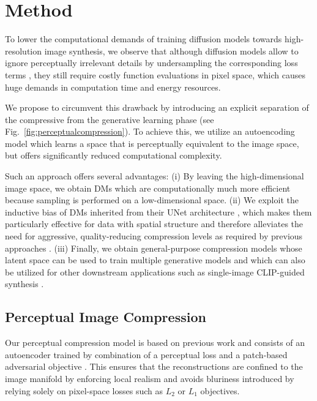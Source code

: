 \documentclass[10pt,twocolumn,letterpaper]{article}
\begin{document}
%
%
%
%

%
%
%


\section{Method}
\enlargethispage{\baselineskip}
\label{sec:method}
\vspace{-0.5em}
%
%
%
%
%
%
To lower the computational demands of training diffusion models towards high-resolution image synthesis, 
%
we observe
that although diffusion models 
%
allow
to ignore perceptually irrelevant details by undersampling the corresponding loss terms \cite{DBLP:conf/nips/HoJA20}, 
they still require costly function evaluations in pixel space,
%
%
which causes
huge demands in computation time and energy resources. 
%
%
%
%
%
%
%

We propose to circumvent this drawback by introducing an explicit separation
 of the compressive from the generative learning phase (see
 Fig.~\ref{fig:perceptualcompression}).
 To achieve this, we utilize an autoencoding model which learns a space that is perceptually equivalent to the image space, 
but offers significantly reduced computational complexity.%

%
%

Such an approach offers several advantages: (i)
By leaving the high-dimensional image space, we 
obtain DMs which are computationally much more efficient
%
%
%
%
because sampling is performed on a low-dimensional space.
%
%
%
%
(ii)
%
We exploit the inductive bias of DMs inherited from their UNet architecture
\cite{DBLP:conf/miccai/RonnebergerFB15}, which makes them particularly effective for data with spatial
structure and therefore
%
%
%
%
%
%
%
alleviates the need for aggressive, quality-reducing compression levels as required by previous
approaches \cite{DBLP:journals/corr/abs-2012-09841,
DBLP:journals/corr/abs-2102-12092}.
%
%
%
(iii)
Finally, we obtain general-purpose compression models whose latent space 
can be used to train multiple generative models
%
and which can also be utilized
for other downstream applications such as single-image CLIP-guided synthesis \cite{Frans2021CLIPDrawET}.
%
%
%
%
%
%
%
%
%
%
%
%
%
%
%
%
%
%
%
%
%
%
%
%
%
%
%
%
%
%
%
%
%
%
%
%
%
%
%
%
%
%
%
%
%
%
%

%
%
%
%
%
%

%
\subsection{Perceptual Image Compression}
\vspace{-0.5em}
\label{subsec:stageone}
%
%
%
%
%
%
%
%
%
%
%
Our perceptual compression model 
%
is based on previous work \cite{DBLP:journals/corr/abs-2012-09841} and
consists of an autoencoder trained by combination of a perceptual
loss \cite{lpips} and a patch-based \cite{DBLP:conf/cvpr/IsolaZZE17} adversarial objective \cite{dosovitskiy201perceptual, DBLP:journals/corr/abs-2012-09841, yu2021vectorquantized}. 
This ensures that the reconstructions are 
confined to the image manifold by enforcing local realism and avoids bluriness introduced by relying solely on pixel-space losses
such as $L_2$ or $L_1$ objectives.
\end{document}
